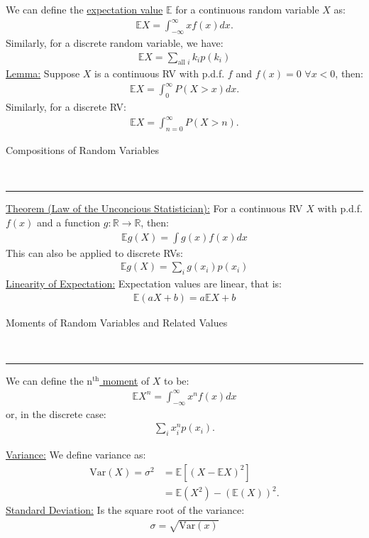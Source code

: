 \documentclass{article}
\newcommand{\header}[1]{\begin{large}\noindent #1\end{large}\\\rule{\textwidth}{0.5pt}}
\newcommand{\sheader}[1]{\underline{#1:}}
\begin{document}
We can define the \underline{expectation value} $\mathbb{E}$ for a continuous random variable $X$ as:
\begin{align*}
    \mathbb{E}X = \int_{-\infty}^{\infty} xf(x)dx.
\end{align*}
Similarly, for a discrete random variable, we have:
\begin{align*}
    \mathbb{E}X = \sum_{\textrm{all } i} k_ip(k_i)
\end{align*}
\sheader{Lemma} Suppose $X$ is a continuous RV with p.d.f. $f$ and $f(x) = 0$ $\forall x < 0$,
then:
\begin{align*}
    \mathbb{E}X = \int_0^\infty P(X > x)dx.
\end{align*}
Similarly, for a discrete RV:
\begin{align*}
    \mathbb{E}X = \int_{n = 0}^\infty P(X > n).
\end{align*}
\header{Compositions of Random Variables}
\sheader{Theorem (Law of the Unconcious Statistician)} For a continuous RV $X$ with 
p.d.f. $f(x)$ and a function $g: \mathbb{R} \to \mathbb{R}$, then:
\begin{align*}
    \mathbb{E}g(X) = \int g(x)f(x) dx
\end{align*}
This can also be applied to discrete RVs:
\begin{align*}
    \mathbb{E}g(X) = \sum_i g(x_i) p(x_i)
\end{align*}
\sheader{Linearity of Expectation}
Expectation values are linear, that is:
\begin{align*}
    \mathbb{E}(aX + b) = a\mathbb{E}X + b
\end{align*}

\header{Moments of Random Variables and Related Values}
We can define the \underline{$\textrm{n}^\textrm{th}$ moment} of $X$ to be:
\begin{align*}
    \mathbb{E}X^n = \int_{-\infty}^{\infty}x^n f(x) dx
\end{align*}
or, in the discrete case:
\begin{align*}
    \sum_i x_i^n p(x_i).
\end{align*}

\sheader{Variance} We define variance as:
\begin{align*}
    \textrm{Var}(X) = \sigma^2 &=  \mathbb{E} \left[(X - \mathbb{E}X)^2\right]\\
    &= \mathbb{E}(X^2) - \left(\mathbb{E}(X)\right)^2.
\end{align*}
\sheader{Standard Deviation} Is the square root of the variance:
\begin{align*}
    \sigma = \sqrt{\textrm{Var}(x)}
\end{align*}
\end{document}
